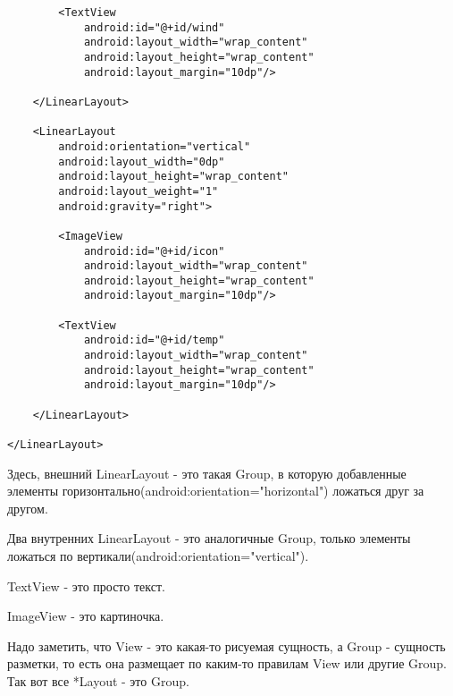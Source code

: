 \documentclass[12 pt]{article}
\begin{document}
\begin{itemize}
\begin{lstlisting}
        <TextView
            android:id="@+id/wind"
            android:layout_width="wrap_content"
            android:layout_height="wrap_content"
            android:layout_margin="10dp"/>

    </LinearLayout>

    <LinearLayout
        android:orientation="vertical"
        android:layout_width="0dp"
        android:layout_height="wrap_content"
        android:layout_weight="1"
        android:gravity="right">
        
        <ImageView
            android:id="@+id/icon"
            android:layout_width="wrap_content"
            android:layout_height="wrap_content"
            android:layout_margin="10dp"/>

        <TextView
            android:id="@+id/temp"
            android:layout_width="wrap_content"
            android:layout_height="wrap_content"
            android:layout_margin="10dp"/>

    </LinearLayout>

</LinearLayout>    
        \end{lstlisting} 
        
        Здесь, внешний LinearLayout - это такая Group, в которую добавленные элементы горизонтально(android:orientation="horizontal") ложаться друг за другом.
        
        Два внутренних LinearLayout - это аналогичные Group, только элементы ложаться по вертикали(android:orientation="vertical").
        
        TextView - это просто текст.
        
        ImageView - это картиночка.
        
        Надо заметить, что View - это какая-то рисуемая сущность, а Group - сущность разметки, то есть она размещает по каким-то правилам View или другие Group. Так вот все *Layout - это Group.
        

\end{itemize}
\end{document}
